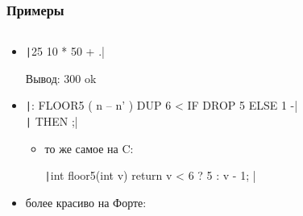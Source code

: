 \documentclass[xetex,mathserif,serif]{beamer}
\begin{document}
    \begin{frame}
        \frametitle{Примеры}
        \begin{columns}
            \begin{column}{0.82\textwidth}
                \begin{itemize}
                    \item \texttt|25 10 * 50 + .|

                        Вывод: 300 ok
                    \item \texttt|: FLOOR5 ( n -- n' )   DUP 6 < IF DROP 5 ELSE 1 -| \\
                        \texttt|  THEN ;|
                    \begin{itemize}
                        \item то же самое на C:

                        \texttt|int floor5(int v) { return v < 6 ? 5 : v - 1; }|
                    \end{itemize}
                    \item более красиво на Форте:


\end{itemize}
\end{column}
\end{columns}
\end{frame}
\end{document}

